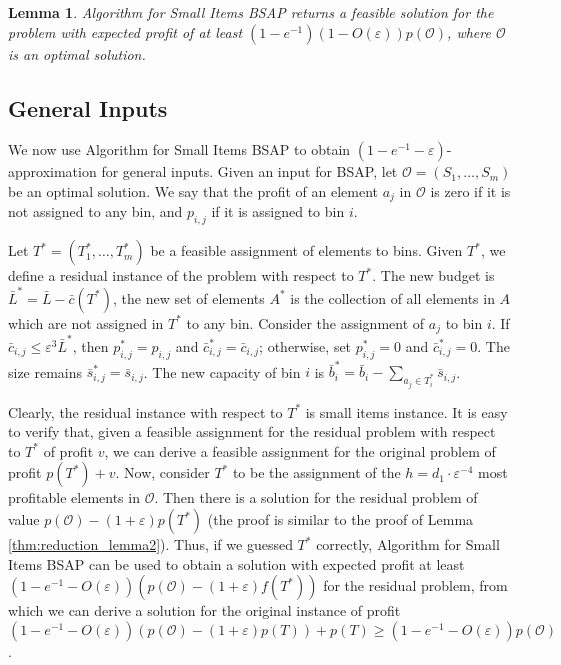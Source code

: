 \documentclass[11pt]{article}
\newtheorem{lemma}[theorem]{Lemma}
\newcommand{\eps}{\varepsilon}
\newcommand{\bs}{\bar{s}}
\newcommand{\bb}{\bar{b}}
\newcommand{\bL}{\bar{L}}
\newcommand{\bc}{\bar{c}}
\newcommand{\mO}{\mathcal{O}}
\begin{document}
{\begin{lemma}
Algorithm for Small Items BSAP returns a feasible solution for the
 problem with expected profit of at least $(1-e^{-1})(1-O(\eps))p(\mO)$, where
$\mO$ is an optimal solution.
\end{lemma}

\subsection{General Inputs}
We now use Algorithm for Small Items BSAP to obtain $(1-e^{-1} - \eps)$-approximation for general inputs. Given an input for BSAP, let $\mO=
(S_1,\ldots,S_m)$ be an optimal solution. We say that the profit of an element $a_j$ in $\mO$ is zero if it is not assigned to any bin, and
$p_{i,j}$ if it is assigned to bin $i$.

Let $T^*=(T^*_1,\ldots,T^*_m)$ be a feasible assignment of elements to bins. Given $T^*$, we define a residual instance of the problem with
respect to $T^*$. The new budget is $\bL^*=\bL - \bc(T^*)$, the new set of elements $A^*$ is the collection of all elements in $A$ which are not
assigned in $T^*$ to any bin. Consider the assignment of  $a_j$ to bin $i$.
 If  $\bc_{i,j} \leq \eps^3 \bL^*$, then $p^*_{i,j}=p_{i,j}$ and
$\bc^*_{i,j}=\bc_{i,j}$; otherwise, set $p^*_{i,j}=0$ and $\bc^*_{i,j}=0$.
 The size remains $\bs^*_{i,j}=\bs_{i,j}$. The new capacity of bin $i$
is $\bb^*_i= \bb_i -\sum_{a_j \in T^*_i} \bs_{i,j}$.

Clearly, the residual instance with respect to $T^*$ is
small items instance. It is easy to verify that,
 given a feasible assignment for the residual
problem with respect to $T^*$ of profit $v$, we can derive a feasible assignment for the original problem of profit $p(T^*) + v$. Now, consider
$T^*$ to be the assignment of the $h=d_1\cdot \eps^{-4}$ most profitable elements in $\mO$. Then there is a solution for the residual problem of
value $p(\mO)- (1+\eps) p(T^*)$ (the proof is similar to the proof of Lemma
 \ref{thm:reduction_lemma2}). Thus, if we guessed $T^*$ correctly,
Algorithm for Small Items BSAP can be used to obtain a solution with expected  profit at least $(1-e^{-1}-O(\eps))
 (p(\mO)- (1+\eps) f(T^*))$ for the residual
problem, from which we can derive a solution for the original instance
of profit $(1-e^{-1}-O(\eps)) (p(\mO)- (1+\eps) p(T)) +p(T) \geq (1-e^{-1} - O(\eps) ) p(\mO)$.

}
\end{document}
